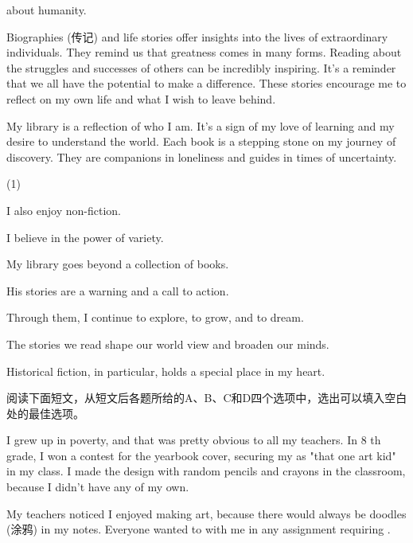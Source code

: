 \documentclass{英语试卷}
\begin{document}
\par about humanity.\par
\par {} Biographies (传记) and life stories offer insights into the lives of extraordinary individuals. They remind us that greatness comes in many forms. Reading about the struggles and successes of others can be incredibly inspiring. It's a reminder that we all have the potential to make a difference. These stories encourage me to reflect on my own life and what I wish to leave behind.\par
\par My library is a reflection of who I am. It's a sign of my love of learning and my desire to understand the world. Each book is a stepping stone on my journey of discovery. They are companions in loneliness and guides in times of uncertainty. \par
\begin{choices}(1)
  \item I also enjoy non-fiction.
  \item I believe in the power of variety.
  \item My library goes beyond a collection of books.
  \item His stories are a warning and a call to action.
  \item Through them, I continue to explore, to grow, and to dream.
  \item The stories we read shape our world view and broaden our minds.
  \item Historical fiction, in particular, holds a special place in my heart.
\end{choices}
\par 阅读下面短文，从短文后各题所给的A、B、C和D四个选项中，选出可以填入空白处的最佳选项。\par
\par I grew up in poverty, and that was pretty obvious to all my teachers. In 8 th grade, I won a contest for  the yearbook cover, securing my  as "that one art kid" in my class. I made the design with random pencils and crayons in the classroom, because I didn't have any of my own.\par
\par My teachers noticed I  enjoyed making art, because there would always be doodles (涂鸦) in my notes. Everyone wanted to  with me in any assignment requiring .\par
\end{document}
